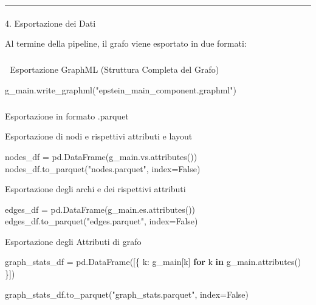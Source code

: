 \documentclass[
  italian,
  a4paper,
]{article}
\makeatletter
\let\oldparagraph\paragraph
\renewcommand{\paragraph}{
    \@ifstar
      \xxxParagraphStar
      \xxxParagraphNoStar
  }
\newcommand{\xxxParagraphStar}[1]{\oldparagraph*{#1}\mbox{}}
\newcommand{\xxxParagraphNoStar}[1]{\oldparagraph{#1}\mbox{}}
\let\oldsubparagraph\subparagraph
\renewcommand{\subparagraph}{
    \@ifstar
      \xxxSubParagraphStar
      \xxxSubParagraphNoStar
  }
\newcommand{\xxxSubParagraphStar}[1]{\oldsubparagraph*{#1}\mbox{}}
\newcommand{\xxxSubParagraphNoStar}[1]{\oldsubparagraph{#1}\mbox{}}
\newenvironment{Shaded}{\begin{snugshade}}{\end{snugshade}}
\newcommand{\ControlFlowTok}[1]{\textcolor[rgb]{0.00,0.23,0.31}{\textbf{#1}}}
\newcommand{\KeywordTok}[1]{\textcolor[rgb]{0.00,0.23,0.31}{\textbf{#1}}}
\newcommand{\NormalTok}[1]{\textcolor[rgb]{0.00,0.23,0.31}{#1}}
\newcommand{\OperatorTok}[1]{\textcolor[rgb]{0.37,0.37,0.37}{#1}}
\newcommand{\StringTok}[1]{\textcolor[rgb]{0.13,0.47,0.30}{#1}}
\newcommand{\VariableTok}[1]{\textcolor[rgb]{0.07,0.07,0.07}{#1}}
\makeatother
\begin{document}
\begin{center}\rule{0.5\linewidth}{0.5pt}\end{center}

\paragraph{4. Esportazione dei Dati}\label{esportazione-dei-dati}

Al termine della pipeline, il grafo viene esportato in due formati:

\subparagraph{🔹 Esportazione GraphML (Struttura Completa del
Grafo)}\label{esportazione-graphml-struttura-completa-del-grafo}

\begin{Shaded}
\begin{Highlighting}[]
\NormalTok{g\_main.write\_graphml(}\StringTok{"epstein\_main\_component.graphml"}\NormalTok{)}
\end{Highlighting}
\end{Shaded}

\subparagraph{Esportazione in formato
.parquet}\label{esportazione-in-formato-.parquet}

Esportazione di nodi e rispettivi attributi e layout

\begin{Shaded}
\begin{Highlighting}[]
\NormalTok{nodes\_df }\OperatorTok{=}\NormalTok{ pd.DataFrame(g\_main.vs.attributes())}
\NormalTok{nodes\_df.to\_parquet(}\StringTok{"nodes.parquet"}\NormalTok{, index}\OperatorTok{=}\VariableTok{False}\NormalTok{)}
\end{Highlighting}
\end{Shaded}

Esportazione degli archi e dei rispettivi attributi

\begin{Shaded}
\begin{Highlighting}[]
\NormalTok{edges\_df }\OperatorTok{=}\NormalTok{ pd.DataFrame(g\_main.es.attributes())}
\NormalTok{edges\_df.to\_parquet(}\StringTok{"edges.parquet"}\NormalTok{, index}\OperatorTok{=}\VariableTok{False}\NormalTok{)}
\end{Highlighting}
\end{Shaded}

Esportazione degli Attributi di grafo

\begin{Shaded}
\begin{Highlighting}[]
\NormalTok{graph\_stats\_df }\OperatorTok{=}\NormalTok{ pd.DataFrame([\{}
\NormalTok{    k: g\_main[k] }\ControlFlowTok{for}\NormalTok{ k }\KeywordTok{in}\NormalTok{ g\_main.attributes()}
\NormalTok{\}])}

\NormalTok{graph\_stats\_df.to\_parquet(}\StringTok{"graph\_stats.parquet"}\NormalTok{, index}\OperatorTok{=}\VariableTok{False}\NormalTok{)}
\end{Highlighting}
\end{Shaded}
\end{document}
